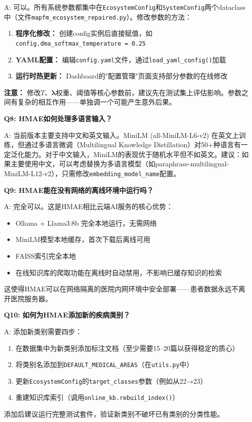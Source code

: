 \documentclass[11pt,a4paper]{ctexart}
\begin{document}
A: 可以。所有系统参数都集中在\texttt{EcosystemConfig}和\texttt{SystemConfig}两个dataclass中（文件\texttt{mapfm\_ecosystem\_repaired.py}）。修改参数的方法：
\begin{enumerate}[nosep]
\item \textbf{程序化修改：} 创建config实例后直接赋值，如\texttt{config.dma\_softmax\_temperature = 0.25}
\item \textbf{YAML配置：} 编辑\texttt{config.yaml}文件，通过\texttt{load\_yaml\_config()}加载
\item \textbf{运行时热更新：} Dashboard的"配置管理"页面支持部分参数的在线修改
\end{enumerate}
\textbf{注意：} 修改$T$、$\boldsymbol{\lambda}$权重、阈值等核心参数前，建议先在测试集上评估影响。参数之间有复杂的相互作用——单独调一个可能产生意外后果。

\textbf{Q8: HMAE如何处理多语言输入？}

A: 当前版本主要支持中文和英文输入。MiniLM (all-MiniLM-L6-v2) 在英文上训练，但通过多语言微调（Multilingual Knowledge Distillation）对50+种语言有一定泛化能力。对于中文输入，MiniLM的表现优于随机水平但不如英文。建议：如果主要使用中文，可以考虑替换为多语言模型（如paraphrase-multilingual-MiniLM-L12-v2），只需修改\texttt{embedding\_model\_name}配置。

\textbf{Q9: HMAE能在没有网络的离线环境中运行吗？}

A: 完全可以。这是HMAE相比云端AI服务的核心优势：
\begin{itemize}[nosep]
\item Ollama + Llama3:8b 完全本地运行，无需网络
\item MiniLM模型本地缓存，首次下载后离线可用
\item FAISS索引完全本地
\item 在线知识库的爬取功能在离线时自动禁用，不影响已缓存知识的检索
\end{itemize}
这使得HMAE可以在网络隔离的医院内网环境中安全部署——患者数据永远不离开医院服务器。

\textbf{Q10: 如何为HMAE添加新的疾病类别？}

A: 添加新类别需要四步：
\begin{enumerate}[nosep]
\item 在数据集中为新类别添加标注文档（至少需要15--20篇以获得稳定的质心）
\item 将类别名添加到\texttt{DEFAULT\_MEDICAL\_AREAS}（在\texttt{utils.py}中）
\item 更新\texttt{EcosystemConfig}的\texttt{target\_classes}参数（例如从22→23）
\item 重建知识库索引（调用\texttt{online\_kb.rebuild\_index()}）
\end{enumerate}
添加后建议运行完整测试套件，验证新类别不破坏已有类别的分类性能。
\end{document}
